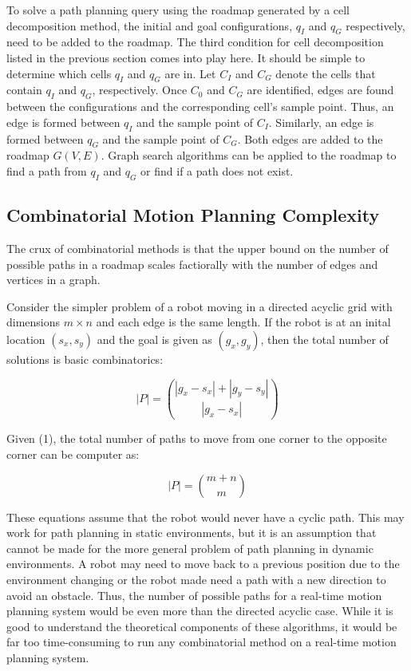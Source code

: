 \documentclass[10pt,conference]{ieeeconf}
\begin{document}
To solve a path planning query using the roadmap generated by a cell decomposition method, the initial and goal configurations, $q_I$ and $q_G$ respectively, need to be added to the roadmap. The third condition for cell decomposition listed in the previous section comes into play here. It should be simple to determine which cells $q_I$ and $q_G$ are in. Let $C_I$ and $C_G$ denote the cells that contain $q_I$ and $q_G$, respectively. Once $C_0$ and $C_G$ are identified, edges are found between the configurations and the corresponding cell's sample point. Thus, an edge is formed between $q_I$ and the sample point of $C_I$. Similarly, an edge is formed between $q_G$ and the sample point of $C_G$. Both edges are added to the roadmap $G(V,E)$. Graph search algorithms can be applied to the roadmap to find a path from $q_I$ and $q_G$ or find if a path does not exist.


\subsection{Combinatorial Motion Planning Complexity}

The crux of combinatorial methods is that the upper bound on the number of possible paths in a roadmap scales factiorally with the number of edges and vertices in a graph. 

Consider the simpler problem of a robot moving in a directed acyclic grid with dimensions $m \times n$ and each edge is the same length. If the robot is at an inital location $(s_x, s_y)$ and the goal is given as $(g_x, g_y)$, then the total number of solutions is basic combinatorics:

\begin{equation}
|P| = { |g_x-s_x|+|g_y-s_y| \choose |g_x-s_x| }
\end{equation}

Given (1), the total number of paths to move from one corner to the opposite corner can be computer as:

\begin{equation}
|P| = {m+n \choose m}
\end{equation}

These equations assume that the robot would never have a cyclic path. This may work for path planning in static environments, but it is an assumption that cannot be made for the more general problem of path planning in dynamic environments. A robot may need to move back to a previous position due to the environment changing or the robot made need a path with a new direction to avoid an obstacle. Thus, the number of possible paths for a real-time motion planning system would be even more than the directed acyclic case. While it is good to understand the theoretical components of these algorithms, it would be far too time-consuming to run any combinatorial method on a real-time motion planning system. 
\end{document}
